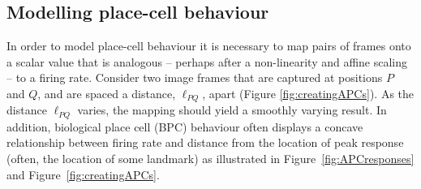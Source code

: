 %
%
%
%



\subsection{Modelling place-cell behaviour}
\label{sec:kerneltoAPC}
In order to model place-cell behaviour it is necessary to map pairs of frames onto a scalar value that is analogous -- perhaps after a non-linearity and affine scaling -- to a firing rate. Consider two image frames that are captured at positions $P$ and $Q$, and are spaced a distance, $\ell_{PQ}$, apart (Figure \ref{fig:creatingAPCs}). As the distance $\ell_{PQ}$ varies, the mapping should yield a smoothly varying result. In addition, biological place cell (BPC) behaviour often displays a concave relationship between firing rate and distance from the location of peak response (often, the location of some landmark) as illustrated in Figure~\ref{fig:APCresponses} and Figure~\ref{fig:creatingAPCs}.


